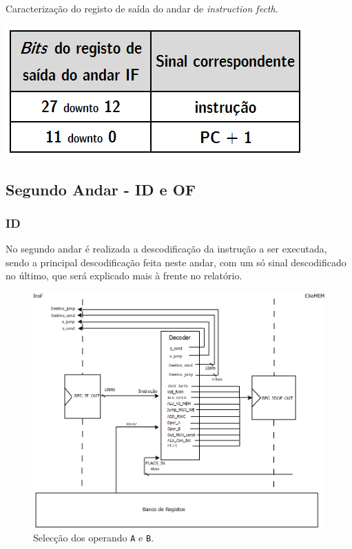 \documentclass[11pt]{article}
\numberwithin{equation}{section}
\begin{document}

\begin{table}[h]
	\centering
	\caption{Caracterização do registo de saída do andar de \textit{instruction fecth}.}
	\vspace{-2mm}
 	\includegraphics[keepaspectratio=true, scale=0.35]{tabelas/regIF}
\end{table}

\subsection{Segundo Andar - ID e OF}

\subsubsection{ID}

No segundo andar é realizada a descodificação da instrução a ser executada, sendo a principal descodificação feita neste andar, com um só sinal descodificado no último, que será explicado mais à frente no relatório.

\begin{figure}[H]
	\centering
	\includegraphics[keepaspectratio=true, scale=0.35]{imagens/idof}
	\caption{Selecção dos operando \texttt{A} e \texttt{B}.}
	\vspace{-0.8em}
\end{figure}
\end{document}
